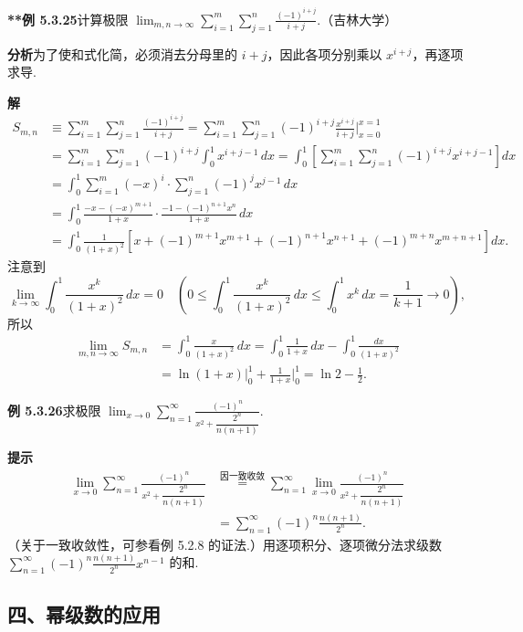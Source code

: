 \documentclass[UTF8,12pt,a4paper,fontset=fandol]{ctexart}
\begin{document}
\noindent\textbf{**例 5.3.25}\quad 计算极限
$\displaystyle\lim_{m,n\to\infty}\sum_{i=1}^m\sum_{j=1}^n\frac{(-1)^{i+j}}{i+j}$.（吉林大学）

\noindent\textbf{分析}\quad 为了使和式化简，必须消去分母里的 $i+j$，因此各项分别乘以 $x^{i+j}$，再逐项求导.

\noindent\textbf{解}\quad
\[
\begin{aligned}
S_{m,n}
&\equiv\sum_{i=1}^m\sum_{j=1}^n\frac{(-1)^{i+j}}{i+j}
=\sum_{i=1}^m\sum_{j=1}^n(-1)^{i+j}\frac{x^{i+j}}{i+j}\bigg|_{x=0}^{x=1}\\
&=\sum_{i=1}^m\sum_{j=1}^n(-1)^{i+j}\int_0^1 x^{i+j-1}\,dx
=\int_0^1\left[\sum_{i=1}^m\sum_{j=1}^n(-1)^{i+j}x^{i+j-1}\right]dx\\
&=\int_0^1\sum_{i=1}^m(-x)^i\cdot\sum_{j=1}^n(-1)^jx^{j-1}\,dx\\
&=\int_0^1\frac{-x-(-x)^{m+1}}{1+x}\cdot\frac{-1-(-1)^{n+1}x^n}{1+x}\,dx\\
&=\int_0^1\frac1{(1+x)^2}\left[x+(-1)^{m+1}x^{m+1}
+(-1)^{n+1}x^{n+1}+(-1)^{m+n}x^{m+n+1}\right]dx.
\end{aligned}
\]
注意到
\[
  \lim_{k\to\infty}\int_0^1\frac{x^k}{(1+x)^2}\,dx=0
  \quad\left(0\le\int_0^1\frac{x^k}{(1+x)^2}\,dx\le\int_0^1x^k\,dx=\frac1{k+1}\to0\right),
\]
所以
\[
\begin{aligned}
\lim_{m,n\to\infty}S_{m,n}
&=\int_0^1\frac{x}{(1+x)^2}\,dx
=\int_0^1\frac1{1+x}\,dx-\int_0^1\frac{dx}{(1+x)^2}\\
&=\ln(1+x)\bigg|_0^1+\frac1{1+x}\bigg|_0^1
=\ln2-\frac12.
\end{aligned}
\]

\noindent\textbf{例 5.3.26}\quad 求极限
$\displaystyle\lim_{x\to0}\sum_{n=1}^{\infty}\frac{(-1)^n}{x^2+\dfrac{2^n}{n(n+1)}}$.

\noindent\textbf{提示}\quad
\[
\begin{aligned}
\lim_{x\to0}\sum_{n=1}^{\infty}\frac{(-1)^n}{x^2+\dfrac{2^n}{n(n+1)}}
&\overset{\text{因一致收敛}}{=}
\sum_{n=1}^{\infty}\lim_{x\to0}\frac{(-1)^n}{x^2+\dfrac{2^n}{n(n+1)}}\\
&=\sum_{n=1}^{\infty}(-1)^n\frac{n(n+1)}{2^n}.
\end{aligned}
\]
（关于一致收敛性，可参看例 5.2.8 的证法.）用逐项积分、逐项微分法求级数
$\displaystyle\sum_{n=1}^{\infty}(-1)^n\frac{n(n+1)}{2^n}x^{n-1}$ 的和.

\subsection*{四、幂级数的应用}
\end{document}
